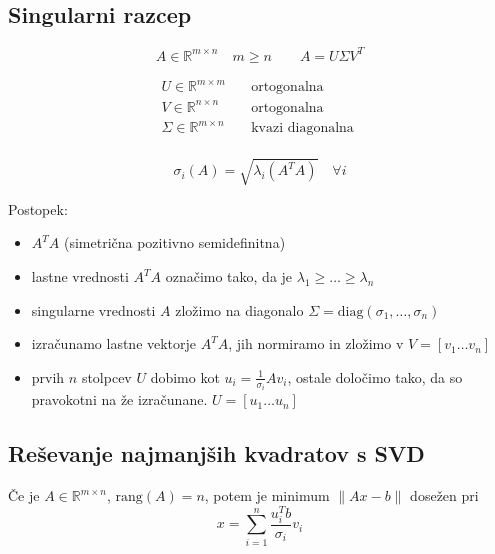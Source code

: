 \begin{multicols}{4}
\section{Singularni razcep}
\[ A \in \mathbb{R}^{m\times n} \quad m \geq n \qquad A = U \Sigma V^T\]

\begin{align*}
	U \in \mathbb{R}^{m\times m} \quad &\text{ortogonalna } \\
	V \in \mathbb{R}^{n\times n} \quad &\text{ortogonalna } \\
	\Sigma \in \mathbb{R}^{m\times n} \quad &\text{kvazi diagonalna } \\
\end{align*}

\[ \sigma_i (A) = \sqrt{\lambda_i(A^TA)} \quad \forall i\]

Postopek:
\begin{itemize}
	\item $A^TA$ (simetrična pozitivno semidefinitna)
	\item lastne vrednosti $A^TA$ označimo tako, da je $\lambda_1 \geq \dots \geq \lambda_n$
	\item singularne vrednosti $A$ zložimo na diagonalo $\Sigma = \text{diag}(\sigma_1, \dots, \sigma_n)$
	\item izračunamo lastne vektorje $A^TA$, jih normiramo in zložimo v $V = [v_1 \dots v_n]$
	\item prvih $n$ stolpcev $U$ dobimo kot $u_i = \frac{1}{\sigma_i} A v_i$, ostale določimo tako, da so pravokotni na že izračunane. $U = [u_1 \dots u_n]$
\end{itemize}

\subsection{Reševanje najmanjših kvadratov s SVD}
Če je $A \in \mathbb{R}^{m\times n}$, $\text{rang}(A) = n$, potem je minimum $\| Ax - b\|$ dosežen pri
\[ x = \sum_{i=1}^n \frac{u_i^Tb}{\sigma_i} v_i\]

\end{multicols}
